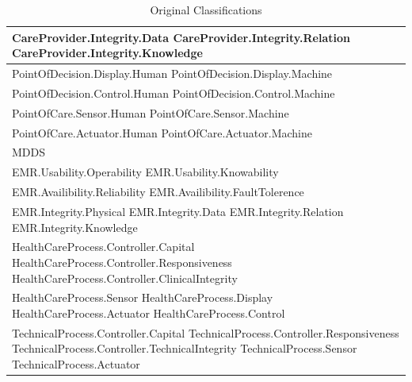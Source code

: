 \documentclass[11pt, notitlepage,abstracton,oneside]{article}   	%
\begin{document}
\begin{table}[ht]
\caption{Original Classifications}
\label{tab:OriginalClassifications}
\begin{center}
\begin{tabular}{|p{80mm}|}
\hline
CareProvider.Integrity.Data \newline CareProvider.Integrity.Relation \newline CareProvider.Integrity.Knowledge \\ \hline
PointOfDecision.Display.Human \newline PointOfDecision.Display.Machine \\ \hline
PointOfDecision.Control.Human \newline PointOfDecision.Control.Machine \\ \hline
PointOfCare.Sensor.Human \newline PointOfCare.Sensor.Machine \\ \hline
PointOfCare.Actuator.Human \newline PointOfCare.Actuator.Machine \\ \hline
MDDS \\ \hline
EMR.Usability.Operability \newline EMR.Usability.Knowability \\ \hline
EMR.Availibility.Reliability \newline EMR.Availibility.FaultTolerence \\ \hline
EMR.Integrity.Physical \newline EMR.Integrity.Data \newline EMR.Integrity.Relation \newline EMR.Integrity.Knowledge \\ \hline
HealthCareProcess.Controller.Capital \newline HealthCareProcess.Controller.Responsiveness \newline HealthCareProcess.Controller.ClinicalIntegrity \\ \hline
HealthCareProcess.Sensor \newline HealthCareProcess.Display \newline HealthCareProcess.Actuator \newline HealthCareProcess.Control \\ \hline
TechnicalProcess.Controller.Capital \newline TechnicalProcess.Controller.Responsiveness \newline TechnicalProcess.Controller.TechnicalIntegrity \newline TechnicalProcess.Sensor \newline TechnicalProcess.Actuator \\ \hline
\end{tabular}
\end{center}
\label{default}
\end{table}%
\end{document}
